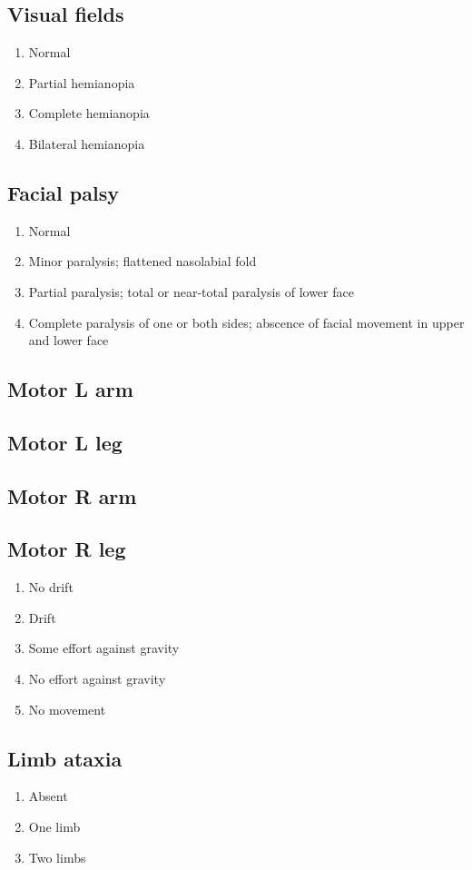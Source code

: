 \documentclass[8pt]{extarticle}
\begin{document}
\begin{multicols*}{2}
\subsection{Visual fields}
\begin{enumerate}
    \item{Normal}
    \item{Partial hemianopia}
    \item{Complete hemianopia}
    \item{Bilateral hemianopia}
\end{enumerate}

\subsection{Facial palsy}
\begin{enumerate}
    \item{Normal}
    \item{Minor paralysis; flattened nasolabial fold}
    \item{Partial paralysis; total or near-total paralysis of lower face}
    \item{Complete paralysis of one or both sides; abscence of facial movement in upper and lower face}
\end{enumerate}

\subsection{Motor L arm}
\subsection{Motor L leg}
\subsection{Motor R arm}
\subsection{Motor R leg}
\begin{enumerate}
    \item{No drift}
    \item{Drift}
    \item{Some effort against gravity}
    \item{No effort against gravity}
    \item{No movement}
\end{enumerate}

\subsection{Limb ataxia}
\begin{enumerate}
    \item{Absent}
    \item{One limb}
    \item{Two limbs}
\end{enumerate}


\end{multicols*}
\end{document}
